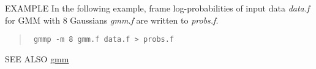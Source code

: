 \begin{options}
\end{options}

\begin{qsection}{EXAMPLE}
In the following example, frame log-probabilities of input data {\em
data.f} for GMM with 8 Gaussians {\em gmm.f} are written to {\em
probs.f}.

\begin{quote}
\verb! gmmp -m 8 gmm.f data.f > probs.f!
\end{quote}
\end{qsection}

\begin{qsection}{SEE ALSO}
\hyperlink{gmm}{gmm}
\end{qsection}
